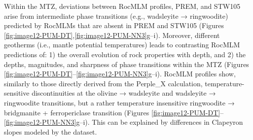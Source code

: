 \documentclass[draft,linenumbers]{agujournal2018}
\begin{document}
Within the MTZ, deviations between RocMLM profiles, PREM, and STW105 arise from intermediate phase transitions (e.g., wadsleyite → ringwoodite) predicted by RocMLMs that are absent in PREM and STW105 (Figures \ref{fig:image12-PUM-DT},\ref{fig:image12-PUM-NN3}g--i). Moreover, different geotherms (i.e., mantle potential temperatures) leads to contrasting RocMLM predictions of: 1) the overall evolution of rock properties with depth, and 2) the depths, magnitudes, and sharpness of phase transitions within the MTZ (Figures \ref{fig:image12-PUM-DT}--\ref{fig:image12-PUM-NN3}g--i). RocMLM profiles show, similarly to those directly derived from the Perple\_X calculation, temperature-sensitive discontinuities at the olivine → wadsleyite and wadsleyite → ringwoodite transitions, but a rather temperature insensitive ringwoodite → bridgmanite + ferropericlase transition (Figures \ref{fig:image12-PUM-DT}--\ref{fig:image12-PUM-NN3}g--i). This can be explained by differences in Clapeyron slopes modeled by the \citet{stixrude2022} dataset.
\end{document}
